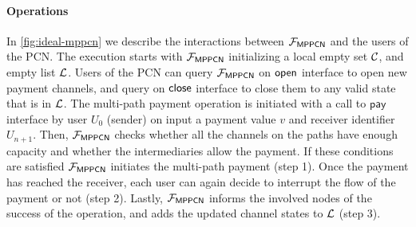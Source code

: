 \paragraph{Operations}
In \cref{fig:ideal-mppcn} we describe the interactions between $\mathcal{F}_{\mathsf{MPPCN}}$ and the 
users of the PCN. The execution starts with $\mathcal{F}_{\mathsf{MPPCN}}$ initializing a local empty 
set $\mathcal{C}$, and empty list $\mathcal{L}$. Users of the PCN can query $\mathcal{F}_{\mathsf{MPPCN}}$ on $\mathsf{open}$ 
interface to open new payment channels, and query on $\mathsf{close}$ interface to close them to any 
valid state that is in $\mathcal{L}$. The multi-path payment operation is initiated with a call to 
$\mathsf{pay}$ interface by user $U_0$ (sender) on input a payment value $v$ and receiver 
identifier $U_{n+1}$. Then, $\mathcal{F}_{\mathsf{MPPCN}}$ checks whether all the channels on the paths 
have enough capacity and whether the intermediaries allow the payment. If these conditions are 
satisfied $\mathcal{F}_{\mathsf{MPPCN}}$ initiates the multi-path payment (step 1). Once the payment has 
reached the receiver, each user can again decide to interrupt the flow of the payment or not 
(step 2). Lastly, $\mathcal{F}_{\mathsf{MPPCN}}$ informs the involved nodes of the success of the 
operation, and adds the updated channel states to $\mathcal{L}$ (step 3).

